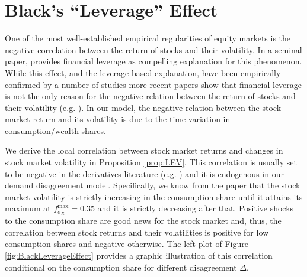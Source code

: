 \section{Black's ``Leverage'' Effect}

One of the most well-established empirical regularities of equity markets is the negative correlation between the return of stocks and their volatility. In a seminal paper,  provides financial leverage as compelling explanation for this phenomenon. While this effect, and the leverage-based explanation, have been empirically confirmed by a number of studies more recent papers show that financial leverage is not the only reason for the negative relation between the return of stocks and their volatility (e.g. ). %
In our model, the negative relation between the stock market return and its volatility is due to the time-variation in consumption/wealth shares.     


We derive the local correlation between stock market returns and changes in stock market volatility in Proposition \ref{prop:LEV}. This correlation is usually set to be negative in the derivatives literature (e.g. ) and it is endogenous in our demand disagreement model. Specifically, we know from the paper that the stock market volatility is strictly increasing in the consumption share until it attains its maximum at $f_{\sigma_R}^{\text{max}}=0.35$ and it is strictly decreasing after that. Positive shocks to the consumption share are good news for the stock market and, thus, the correlation between stock returns and their volatilities is positive for low consumption shares and negative otherwise.  The left plot of Figure \ref{fig:BlackLeverageEffect} provides a graphic illustration of this correlation conditional on the consumption share for different disagreement $\Delta$.  


